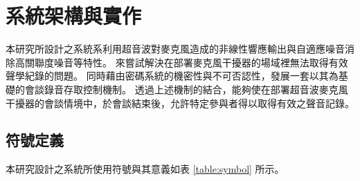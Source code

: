 \chapter{系統架構與實作}

    本研究所設計之系統系利用超音波對麥克風造成的非線性響應輸出與自適應噪音消除高關聯度噪音等特性。
來嘗試解決在部署麥克風干擾器的場域裡無法取得有效聲學紀錄的問題。
同時藉由密碼系統的機密性與不可否認性，發展一套以其為基礎的會談錄音存取控制機制。
透過上述機制的結合，能夠使在部署超音波麥克風干擾器的會談情境中，於會談結束後，允許特定參與者得以取得有效之聲音記錄。


\section{符號定義}

    本研究設計之系統所使用符號與其意義如表 \ref{table:symbol} 所示。

